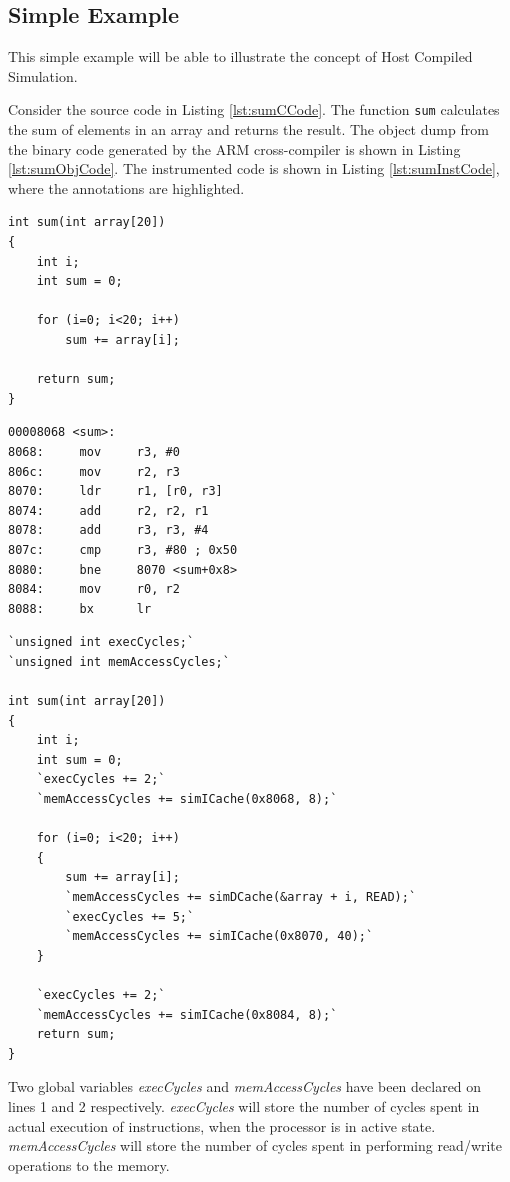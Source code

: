 \subsection{Simple Example}
This simple example will be able to illustrate the concept of Host Compiled Simulation.

Consider the source code in Listing \ref{lst:sumCCode}. The function \texttt{sum} calculates the sum of elements in an array and returns the result. The object dump from the binary code generated by the ARM cross-compiler is shown in Listing \ref{lst:sumObjCode}. The instrumented code is shown in Listing \ref{lst:sumInstCode}, where the annotations are highlighted.

\begin{minipage}{0.5\textwidth}
\begin{lstlisting}[caption={Simple C Code},label={lst:sumCCode}]
int sum(int array[20])
{
	int i;
	int sum = 0;
	
	for (i=0; i<20; i++)
		sum += array[i];
	
	return sum;
}
\end{lstlisting}
\end{minipage}%
\begin{minipage}{0.5\textwidth}
\begin{lstlisting}[caption={Objdump Code},label={lst:sumObjCode}]
00008068 <sum>:
8068:     mov     r3, #0
806c:     mov     r2, r3
8070:     ldr     r1, [r0, r3]
8074:     add     r2, r2, r1
8078:     add     r3, r3, #4
807c:     cmp     r3, #80 ; 0x50
8080:     bne     8070 <sum+0x8>
8084:     mov     r0, r2
8088:     bx      lr
\end{lstlisting}
\end{minipage}

\begin{lstlisting}[caption={Instrumented Code},label={lst:sumInstCode}]
`unsigned int execCycles;`
`unsigned int memAccessCycles;`

int sum(int array[20])
{
	int i;
	int sum = 0;
	`execCycles += 2;`
	`memAccessCycles += simICache(0x8068, 8);`
	
	for (i=0; i<20; i++)
	{
		sum += array[i];
		`memAccessCycles += simDCache(&array + i, READ);`
		`execCycles += 5;`
		`memAccessCycles += simICache(0x8070, 40);`
	}
	
	`execCycles += 2;`
	`memAccessCycles += simICache(0x8084, 8);`
	return sum;
}
\end{lstlisting}

Two global variables \emph{execCycles} and \emph{memAccessCycles} have been declared on lines 1 and 2 respectively. \emph{execCycles} will store the number of cycles spent in actual execution of instructions, when the processor is in active state. \emph{memAccessCycles} will store the number of cycles spent in performing read/write operations to the memory.

